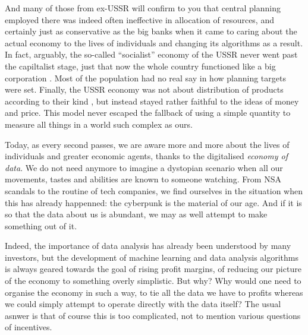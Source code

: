 \documentclass{article}
\begin{document}
And many of those from ex-USSR will confirm to you that central planning employed there was indeed often ineffective in
allocation of resources,
and certainly just as conservative as the big banks when it came to caring about the actual economy to the
lives of individuals and changing its algorithms as a result. In fact, arguably, the so-called
``socialist'' economy of the USSR never went past the capiltalist stage, just that now the
whole country functioned like a big corporation  \cite{CLIFF}. Most of the
population had no real say in how planning targets were set. Finally, the USSR economy was
not about distribution of products according to their kind \cite{NEURATH}, but instead
stayed rather faithful to the ideas of money and price. This model never escaped the fallback
of using a simple quantity to measure all things in a world such complex as ours.


Today, as every second passes, we are aware more and more about the lives of individuals and
greater economic agents, thanks to the digitalised \emph{economy of data}. We do not need anymore to imagine
a dystopian scenario when all our movements, tastes and abilities are known to someone watching. From
NSA scandals to the routine of tech companies, we find ourselves in the situation when this has already
happenned: the cyberpunk is the material of our age.
And if it is so that the data about us is abundant, we may as well attempt to make something
out of it.

Indeed, the importance of data analysis has already
been understood by many investors, but the development of machine learning and data analysis algorithms
is always geared towards the goal of rising profit margins, of reducing our picture of the economy to
something overly simplistic. But why? Why would one need to
organise the economy in such a way, to tie all the data we have to profits whereas we
could simply attempt to operate directly with the data itself? The usual asnwer is that
of course this is too complicated, not to mention various questions of incentives.
\end{document}
